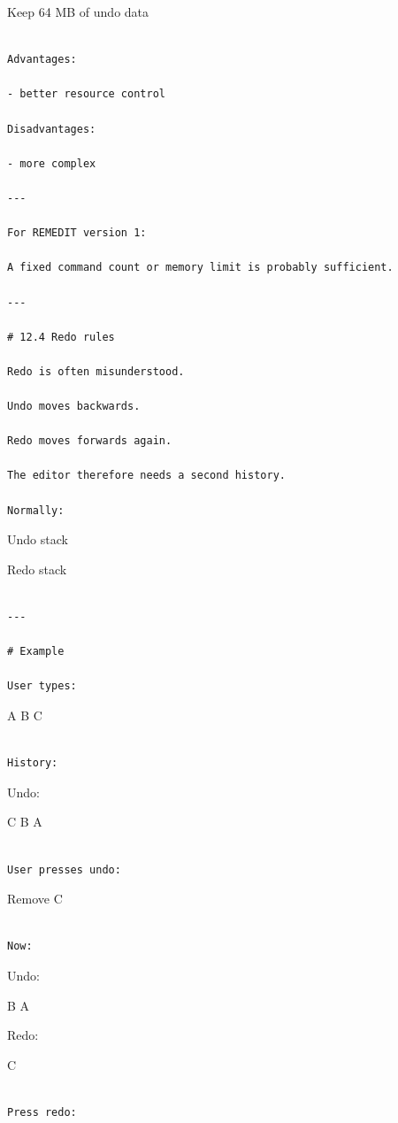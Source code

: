 \documentclass[
  oneside,
  openany]{book}
\begin{document}
Keep 64 MB of undo data

\begin{verbatim}

Advantages:

- better resource control

Disadvantages:

- more complex

---

For REMEDIT version 1:

A fixed command count or memory limit is probably sufficient.

---

# 12.4 Redo rules

Redo is often misunderstood.

Undo moves backwards.

Redo moves forwards again.

The editor therefore needs a second history.

Normally:
\end{verbatim}

Undo stack

Redo stack

\begin{verbatim}

---

# Example

User types:
\end{verbatim}

A B C

\begin{verbatim}

History:
\end{verbatim}

Undo:

C B A

\begin{verbatim}

User presses undo:
\end{verbatim}

Remove C

\begin{verbatim}

Now:
\end{verbatim}

Undo:

B A

Redo:

C

\begin{verbatim}

Press redo:
\end{verbatim}
\end{document}
